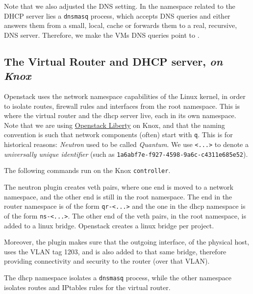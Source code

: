 
Note that we also adjusted the DNS setting. In the namespace related
to the DHCP server lies a \texttt{dnsmasq} process, which accepts DNS
queries and either answers them from a small, local, cache or forwards
them to a real, recursive, DNS server. Therefore, we make the VMs DNS
queries point to .

\subsection{The Virtual Router and DHCP server, \emph{on  Knox}}
\label{section:virtual:router}
\label{section:dhcp:server:knox}

Openstack uses the network namespace capabilities of the Linux kernel,
in order to isolate routes, firewall rules and interfaces from the
root namespace. This is where the virtual router and the dhcp server
live, each in its own namespace. Note that we are using
\href{http://docs.openstack.org/liberty/install-guide-ubuntu/}{Openstack
  Liberty} on Knox, and that the naming convention is such that
network components (often) start with \texttt{q}. This is for
historical reasons: \emph{Neutron} used to be called
\emph{Quantum}. We use \texttt{\textless{}...\textgreater{}} to denote
a \emph{universally unique identifier} (such as
\texttt{1a6abf7e-f927-4598-9a6c-c4311e685e52}).

The following commands run on the Knox \texttt{controller}.


The neutron plugin creates veth pairs, where one end is moved to a
network namespace, and the other end is still in the root namespace.
The end in the router namespace is of the form
\texttt{qr-\textless{}...\textgreater{}} and the one in the dhcp
namespace is of the form \texttt{ns-\textless{}...\textgreater{}}. The
other end of the veth pairs, in the root namespace, is added to a
linux bridge. Openstack creates a linux bridge per project.

Moreover, the plugin makes sure that the outgoing interface, of the
physical host, uses the VLAN tag 1203, and is also added to that same
bridge, therefore providing connectivity and security to the router
(over that VLAN).

The dhcp namespace isolates a \texttt{dnsmasq} process, while the
other
namespace isolates routes and IPtables rules for the virtual router.


